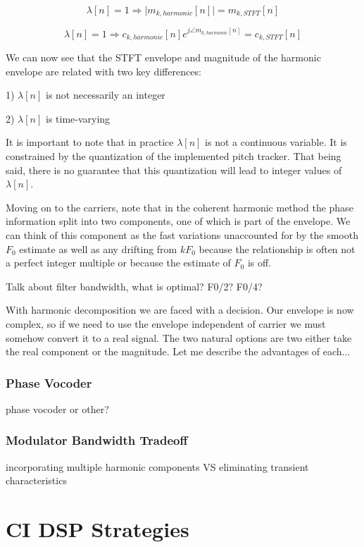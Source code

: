 \documentclass [11pt, proquest] {uwthesis}[2015/03/03]
\begin{document}
$$\lambda[n] = 1 \Rightarrow \vert m_{k,harmonic}[n] \vert = m_{k,STFT}[n]$$

$$\lambda[n] = 1 \Rightarrow c_{k,harmonic}[n]e^{j \angle m_{k,harmonic}[n]} = c_{k,STFT}[n]$$


We can now see that the STFT envelope and magnitude of the harmonic envelope are related with two key differences:

1) $\lambda[n]$ is not necessarily an integer

2) $\lambda[n]$ is time-varying

It is important to note that in practice $\lambda[n]$ is not a continuous variable.  It is constrained by the quantization of the implemented pitch tracker.  That being said, there is no guarantee that this quantization will lead to integer values of $\lambda[n]$.

Moving on to the carriers, note that in the coherent harmonic method the phase information split into two components, one of which is part of the envelope.  We can think of this component as the fast variations unaccounted for by the smooth $F_0$ estimate as well as any drifting from $kF_0$ because the relationship is often not a perfect integer multiple or because the estimate of $F_0$ is off.





Talk about filter bandwidth, what is optimal? F0/2? F0/4?


With harmonic decomposition we are faced with a decision.  Our envelope is now complex, so if we need to use the envelope independent of carrier we must somehow convert it to a real signal.  The two natural options are two either take the real component or the magnitude.  Let me describe the advantages of each...


\subsection{Phase Vocoder}

phase vocoder or other?

\subsection{Modulator Bandwidth Tradeoff}

incorporating multiple harmonic components VS eliminating transient characteristics



\chapter{CI DSP Strategies}
\end{document}
